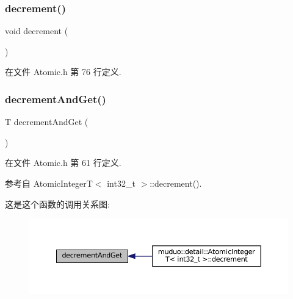 \subsubsection{\texorpdfstring{decrement()}{decrement()}}
{\footnotesize\ttfamily void decrement (\begin{DoxyParamCaption}{ }\end{DoxyParamCaption})\hspace{0.3cm}{\ttfamily [inline]}}



在文件 Atomic.\+h 第 76 行定义.

\mbox{\label{classmuduo_1_1detail_1_1AtomicIntegerT_a943242d48a7e2a97c81651945a90f3f3}} 
\subsubsection{\texorpdfstring{decrement\+And\+Get()}{decrementAndGet()}}
{\footnotesize\ttfamily T decrement\+And\+Get (\begin{DoxyParamCaption}{ }\end{DoxyParamCaption})\hspace{0.3cm}{\ttfamily [inline]}}



在文件 Atomic.\+h 第 61 行定义.



参考自 Atomic\+Integer\+T$<$ int32\+\_\+t $>$\+::decrement().

这是这个函数的调用关系图\+:
\nopagebreak
\begin{figure}[H]
\begin{center}
\leavevmode
\includegraphics[width=350pt]{classmuduo_1_1detail_1_1AtomicIntegerT_a943242d48a7e2a97c81651945a90f3f3_icgraph}
\end{center}
\end{figure}
\mbox{\label{classmuduo_1_1detail_1_1AtomicIntegerT_af6ea056c8af82f08af9fd0d857967f9b}} 
